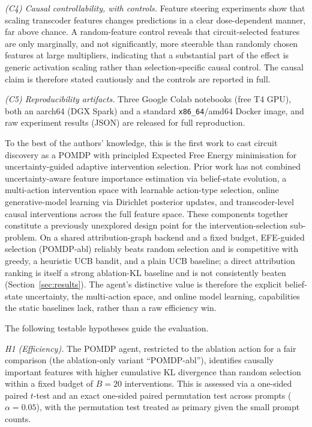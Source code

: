 \emph{(C4) Causal controllability, with controls.} Feature steering experiments
show that scaling transcoder features changes predictions in a clear dose-dependent
manner, far above chance. A random-feature control reveals that
circuit-selected features are only marginally, and not significantly, more
steerable than randomly chosen features at large multipliers, indicating that a
substantial part of the effect is generic activation scaling rather than
selection-specific causal control. The causal claim is therefore stated cautiously
and the controls are reported in full.

\emph{(C5) Reproducibility artifacts.} Three Google Colab notebooks (free T4 GPU),
both an aarch64 (DGX Spark) and a standard \texttt{x86\_64}/amd64 Docker image, and
raw experiment results (JSON) are released for full reproduction.

To the best of the authors' knowledge, this is the first
work to cast circuit discovery as a POMDP with principled Expected Free Energy
minimisation for uncertainty-guided adaptive intervention selection. Prior work has
not combined uncertainty-aware feature importance estimation via belief-state
evolution, a multi-action intervention space with learnable action-type
selection, online generative-model learning via Dirichlet posterior updates,
and transcoder-level causal interventions across the full feature space. These
components together constitute a previously unexplored design
point for the intervention-selection sub-problem.  On a shared
attribution-graph backend and a fixed budget, EFE-guided selection (POMDP-abl)
reliably beats random selection and is competitive with greedy, a heuristic UCB
bandit, and a plain UCB baseline; a direct \EAP{} attribution ranking is itself a
strong ablation-KL baseline and is not consistently beaten
(Section~\ref{sec:results}). The agent's distinctive value is therefore the explicit
belief-state uncertainty, the multi-action space, and online model learning,
capabilities the static baselines lack, rather than a raw efficiency win.

The following testable hypotheses guide the evaluation.

\emph{H1 (Efficiency).}  The POMDP agent, restricted to the ablation
action for a fair comparison (the ablation-only variant ``POMDP-abl''),
identifies causally important features with higher cumulative KL
divergence than random selection within a fixed budget of $B=20$
interventions. This is assessed via a one-sided paired $t$-test and an exact
one-sided paired permutation test across prompts ($\alpha = 0.05$), with the
permutation test treated as primary given the small prompt counts.

